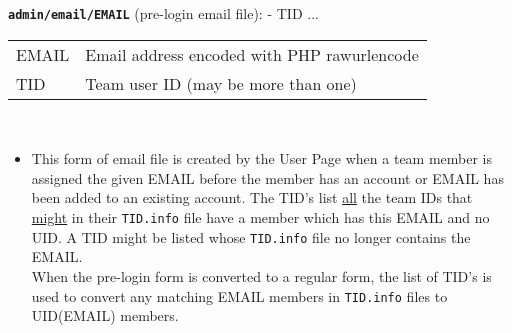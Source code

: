 \documentclass[12pt]{article}
\newenvironment{indpar}[1][0.4in]%
	{\begin{list}{}%
		     {\setlength{\itemsep}{0in}%
		      \setlength{\topsep}{0in}%
		      \setlength{\parsep}{1ex}%
		      \setlength{\labelwidth}{#1}%
		      \setlength{\leftmargin}{#1}%
		      \addtolength{\leftmargin}{\labelsep}}%
	 \item}%
	{\end{list}}
\newenvironment{itemlist}[1][0.2in]%
	{\begin{list}{}{\setlength{\labelwidth}{#1}%
		        \setlength{\leftmargin}{\labelwidth}%
		        \addtolength{\leftmargin}{+0.2in}%
		        \addtolength{\linewidth}{-\labelwidth}%
		        \addtolength{\linewidth}{-0.2in}%
		        \renewcommand{\makelabel}[1]{##1\hfill}}
	 \raggedright}%
	{\end{list}}
\newcommand{\TT}[1]{{\tt \bfseries #1}}
\begin{document}
\begin{indpar}
\begin{itemlist}
\item[\TT{admin/email/EMAIL} (pre-login email file):] - TID ...
\label{ADMIN/EMAIL/EMAIL-PRE-LOGIN} \\
\begin{tabular}[t]{lp{4.0in}}
EMAIL & Email address encoded with PHP rawurlencode \\
TID & Team user ID (may be more than one) \\
\end{tabular}
\\
\begin{itemize}
\item This form of email file is created by the User Page when
a team member is assigned the given EMAIL before the member
has an account or EMAIL has been added to an existing account.
The TID's list \underline{all} the team IDs that
\underline{might} in their {\tt TID.info} file
have a member which has this EMAIL and no UID.
A TID might be listed whose
{\tt TID.info} file no longer contains the EMAIL.
\\[1ex]
When the pre-login form is converted to a regular form,
the list of TID's is used to convert any matching EMAIL members
in {\tt TID.info} files to UID(EMAIL) members.
\end{itemize}


\end{itemlist}
\end{indpar}
\end{document}
